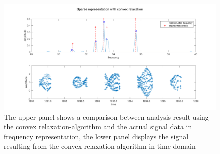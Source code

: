 \begin{figure}[!h]
	\centering
		\includegraphics[width=\textwidth]{images/convex}
		\caption{The upper panel shows a comparison between analysis result using the convex relaxation-algorithm and the actual signal data in frequency representation, the lower panel displays the signal resulting from the convex relaxation algorithm in time domain}
		\label{fig:convex}
\end{figure}


